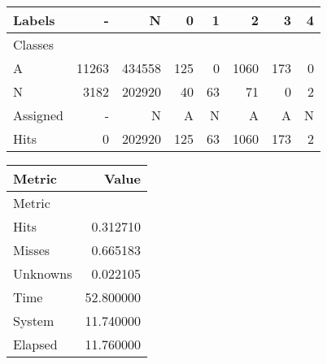 \begin{tabular}{l|r|r|r|r|r|r|r}

Labels &      - &       N &    0 &   1 &     2 &    3 &  4 \\\hline
Classes  &        &         &      &     &       &      &    \\\hline
\hline
A        &  11263 &  434558 &  125 &   0 &  1060 &  173 &  0 \\\hline
N        &   3182 &  202920 &   40 &  63 &    71 &    0 &  2 \\\hline
\hline
Assigned &      - &       N &    A &   N &     A &    A &  N \\\hline
Hits     &      0 &  202920 &  125 &  63 &  1060 &  173 &  2 
\end{tabular}
\begin{tabular}{l|r}

Metric   &      Value \\\hline
Metric   &            \\\hline
\hline
Hits     &   0.312710 \\\hline
Misses   &   0.665183 \\\hline
Unknowns &   0.022105 \\\hline
Time     &  52.800000 \\\hline
System   &  11.740000 \\\hline
Elapsed  &  11.760000 
\end{tabular}
